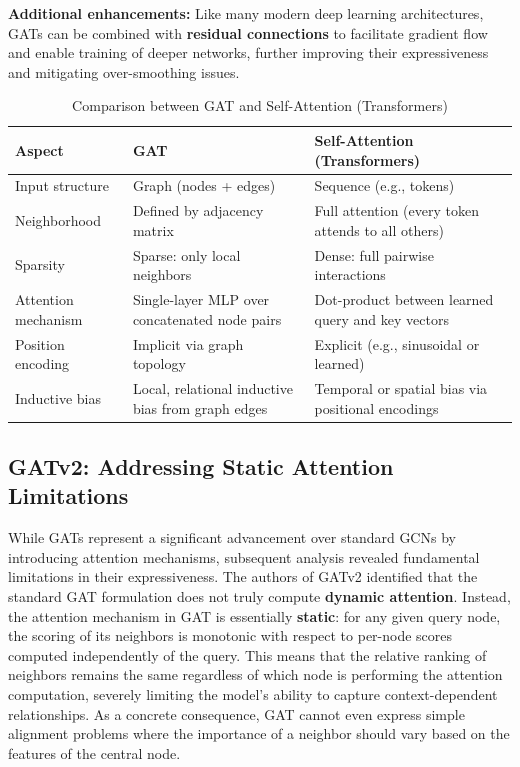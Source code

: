\textbf{Additional enhancements:} Like many modern deep learning architectures, GATs can be combined with \textbf{residual connections} to facilitate gradient flow and enable training of deeper networks, further improving their expressiveness and mitigating over-smoothing issues.

\begin{table}[h]
    \centering
    \caption{Comparison between GAT and Self-Attention (Transformers)}
    \begin{tabular}{|p{3.5cm}|p{5.5cm}|p{5.5cm}|}
    \hline
    \textbf{Aspect} & \textbf{GAT} & \textbf{Self-Attention (Transformers)} \\
    \hline
    Input structure & Graph (nodes + edges) & Sequence (e.g., tokens) \\
    \hline
    Neighborhood & Defined by adjacency matrix & Full attention (every token attends to all others) \\
    \hline
    Sparsity & Sparse: only local neighbors & Dense: full pairwise interactions \\
    \hline
    Attention mechanism & Single-layer MLP over concatenated node pairs & Dot-product between learned query and key vectors \\
    \hline
    Position encoding & Implicit via graph topology & Explicit (e.g., sinusoidal or learned) \\
    \hline
    Inductive bias & Local, relational inductive bias from graph edges & Temporal or spatial bias via positional encodings \\
    \hline
    \end{tabular}
    \label{tab:gat_vs_transformer}
\end{table}

\subsection{GATv2: Addressing Static Attention Limitations}

While GATs represent a significant advancement over standard GCNs by introducing attention mechanisms, subsequent analysis revealed fundamental limitations in their expressiveness. The authors of GATv2 identified that the standard GAT formulation does not truly compute \textbf{dynamic attention}. Instead, the attention mechanism in GAT is essentially \textbf{static}: for any given query node, the scoring of its neighbors is monotonic with respect to per-node scores computed independently of the query. This means that the relative ranking of neighbors remains the same regardless of which node is performing the attention computation, severely limiting the model's ability to capture context-dependent relationships. As a concrete consequence, GAT cannot even express simple alignment problems where the importance of a neighbor should vary based on the features of the central node.

